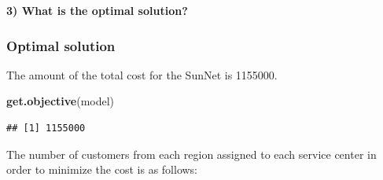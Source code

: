 \documentclass[]{article}
\newenvironment{Shaded}{\begin{snugshade}}{\end{snugshade}}
\newcommand{\CommentTok}[1]{\textcolor[rgb]{0.56,0.35,0.01}{\textit{#1}}}
\newcommand{\DataTypeTok}[1]{\textcolor[rgb]{0.13,0.29,0.53}{#1}}
\newcommand{\DecValTok}[1]{\textcolor[rgb]{0.00,0.00,0.81}{#1}}
\newcommand{\KeywordTok}[1]{\textcolor[rgb]{0.13,0.29,0.53}{\textbf{#1}}}
\newcommand{\NormalTok}[1]{#1}
\newcommand{\OperatorTok}[1]{\textcolor[rgb]{0.81,0.36,0.00}{\textbf{#1}}}
\newcommand{\StringTok}[1]{\textcolor[rgb]{0.31,0.60,0.02}{#1}}
\begin{document}
\begin{Shaded}
\end{Shaded}

\textbf{3) What is the optimal solution?}

\hypertarget{optimal-solution}{%
\subsubsection{Optimal solution}\label{optimal-solution}}

The amount of the total cost for the SunNet is 1155000.

\begin{Shaded}
\begin{Highlighting}[]
\KeywordTok{get.objective}\NormalTok{(model)}
\end{Highlighting}
\end{Shaded}

\begin{verbatim}
## [1] 1155000
\end{verbatim}

The number of customers from each region assigned to each service center
in order to minimize the cost is as follows:
\end{document}
